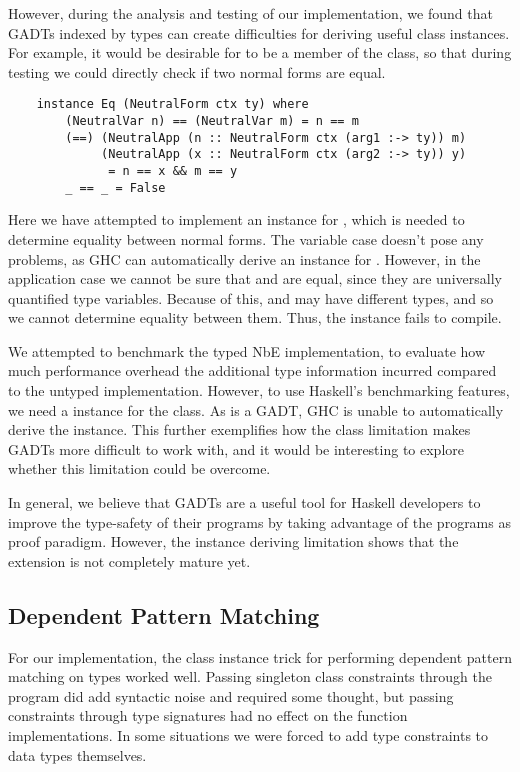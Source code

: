 However, during the analysis and testing of our implementation, we found that GADTs indexed by types can create difficulties for deriving useful class instances. For example, it would be desirable for  to be a member of the  class, so that during testing we could directly check if two normal forms are equal. 

\begin{lstlisting}
    instance Eq (NeutralForm ctx ty) where
        (NeutralVar n) == (NeutralVar m) = n == m
        (==) (NeutralApp (n :: NeutralForm ctx (arg1 :-> ty)) m) 
             (NeutralApp (x :: NeutralForm ctx (arg2 :-> ty)) y) 
              = n == x && m == y 
        _ == _ = False
\end{lstlisting}

Here we have attempted to implement an  instance for , which is needed to determine equality between normal forms. The variable case doesn't pose any problems, as GHC can automatically derive an  instance for . However, in the application case we cannot be sure that  and  are equal, since they are universally quantified type variables. Because of this,  and  may have different types, and so we cannot determine equality between them. Thus, the instance fails to compile.

We attempted to benchmark the typed NbE implementation, to evaluate how much performance overhead the additional type information incurred compared to the untyped implementation. However, to use Haskell's benchmarking features, we need a  instance for the  class. As  is a GADT, GHC is unable to automatically derive the instance. This further exemplifies how the class limitation makes GADTs more difficult to work with, and it would be interesting to explore whether this limitation could be overcome.

In general, we believe that GADTs are a useful tool for Haskell developers to improve the type-safety of their programs by taking advantage of the programs as proof paradigm. However, the instance deriving limitation shows that the extension is not completely mature yet.

\subsection{Dependent Pattern Matching}

For our implementation, the class instance trick for performing dependent pattern matching on types worked well. Passing singleton class constraints through the program did add syntactic noise and required some thought, but passing constraints through type signatures had no effect on the function implementations. In some situations we were forced to add type constraints to data types themselves. 

